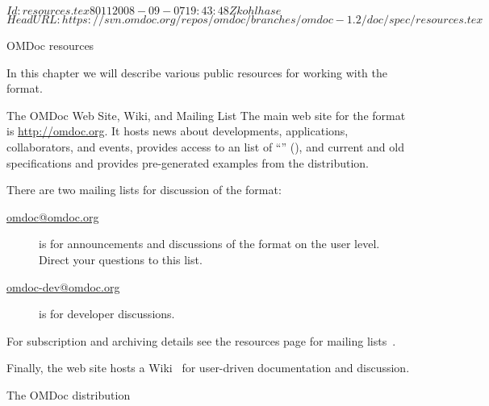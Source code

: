 \svnInfo $Id: resources.tex 8011 2008-09-07 19:43:48Z kohlhase $
\svnKeyword $HeadURL: https://svn.omdoc.org/repos/omdoc/branches/omdoc-1.2/doc/spec/resources.tex $

\begin{tchapter}[id=resources]{OMDoc resources}

In this chapter we will describe various public resources for working with the
{\omdoc} format.

\begin{tsection}[id=website]{The OMDoc Web Site, Wiki, and Mailing List}
  The main web site for the {\omdoc} format is \url{http://omdoc.org}.  It
  hosts news about developments, applications, collaborators, and events, provides access
  to an list of ``'' ({}), and
  current and old {\omdoc} specifications and provides pre-generated examples from the
  {\omdoc} distribution.
  
  There are two mailing lists for discussion of the {\omdoc} format: 
  \begin{description}
  \item[\url{omdoc@omdoc.org}] is for announcements and discussions of the {\omdoc}
    format on the user level. Direct your questions to this list.
  \item[\url{omdoc-dev@omdoc.org}] is for developer discussions.
  \end{description}
  For subscription and archiving details see the {\omdoc} resources page for mailing
  lists~\cite{OMDoc-mailinglists:URL}.
  
  Finally, the {\omdoc} web site hosts a Wiki~\cite{OMDoc:wiki} for user-driven
  documentation and discussion.
\end{tsection}

\begin{tsection}[id=distribution]{The OMDoc distribution}
  

\end{tsection}
\end{tchapter}
